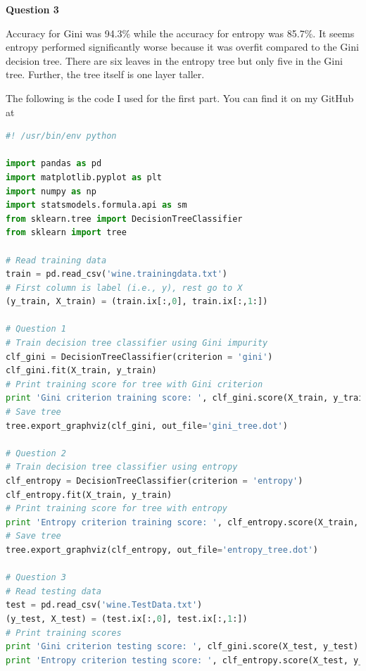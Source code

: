 \documentclass{article}
\begin{document}
	\noindent
	\textbf{Question 3}
	\par 
	Accuracy for Gini was 94.3\% while the accuracy for entropy was 85.7\%. It seems entropy performed significantly worse because it was overfit compared to the Gini decision tree. There are six leaves in the entropy tree but only five in the Gini tree. Further, the tree itself is one layer taller.
	\par 
	The following is the code I used for the first part. You can find it on my GitHub at 
	\newpage
	\begin{lstlisting}[language=python]
#! /usr/bin/env python

import pandas as pd
import matplotlib.pyplot as plt
import numpy as np
import statsmodels.formula.api as sm
from sklearn.tree import DecisionTreeClassifier
from sklearn import tree

# Read training data
train = pd.read_csv('wine.trainingdata.txt')
# First column is label (i.e., y), rest go to X
(y_train, X_train) = (train.ix[:,0], train.ix[:,1:])

# Question 1
# Train decision tree classifier using Gini impurity
clf_gini = DecisionTreeClassifier(criterion = 'gini')
clf_gini.fit(X_train, y_train)
# Print training score for tree with Gini criterion
print 'Gini criterion training score: ', clf_gini.score(X_train, y_train)
# Save tree
tree.export_graphviz(clf_gini, out_file='gini_tree.dot')

# Question 2
# Train decision tree classifier using entropy
clf_entropy = DecisionTreeClassifier(criterion = 'entropy')
clf_entropy.fit(X_train, y_train)
# Print training score for tree with entropy
print 'Entropy criterion training score: ', clf_entropy.score(X_train, y_train)
# Save tree
tree.export_graphviz(clf_entropy, out_file='entropy_tree.dot')

# Question 3
# Read testing data
test = pd.read_csv('wine.TestData.txt')
(y_test, X_test) = (test.ix[:,0], test.ix[:,1:])
# Print training scores
print 'Gini criterion testing score: ', clf_gini.score(X_test, y_test)
print 'Entropy criterion testing score: ', clf_entropy.score(X_test, y_test)
	\end{lstlisting}
	\newpage
	
\end{document}
